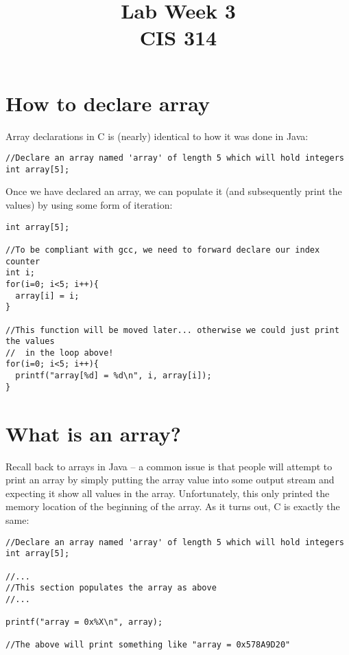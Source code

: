 \documentclass[10pt]{article}
\begin{document}
\title{Lab Week \raisebox{.22ex}{\large\#}3 \\
	CIS 314}
\author{}

\maketitle

\section*{How to declare array}

Array declarations in C is (nearly) identical to how it was done in Java:

\begin{lstlisting}
//Declare an array named 'array' of length 5 which will hold integers
int array[5];
\end{lstlisting}

\noindent Once we have declared an array, we can populate it (and subsequently print the values) by using some form of iteration:


\begin{lstlisting}
int array[5];

//To be compliant with gcc, we need to forward declare our index counter
int i;
for(i=0; i<5; i++){
  array[i] = i;
}

//This function will be moved later... otherwise we could just print the values
//  in the loop above!
for(i=0; i<5; i++){
  printf("array[%d] = %d\n", i, array[i]);
}

\end{lstlisting}




\section*{What is an array?}

Recall back to arrays in Java -- a common issue is that people will attempt to print an array by simply putting the array value into some output stream and expecting it show all values in the array. Unfortunately, this only printed the memory location of the beginning of the array. As it turns out, C is exactly the same:

\begin{lstlisting}
//Declare an array named 'array' of length 5 which will hold integers
int array[5];

//...
//This section populates the array as above
//...

printf("array = 0x%X\n", array);

//The above will print something like "array = 0x578A9D20"

\end{lstlisting}
\end{document}
